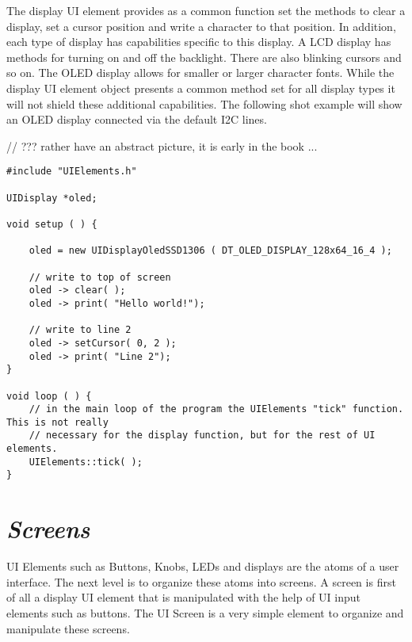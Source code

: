 The display UI element provides as a common function set the methods to clear a display, set a cursor position and write a character to that position. In addition, each type of display has capabilities specific to this display. A LCD display has methods for turning on and off the backlight. There are also blinking cursors and so on. The OLED display allows for smaller or larger character fonts. While the display UI element object presents a common method set for all display types it will not shield these additional capabilities. The following shot example will show an OLED display connected via the default I2C lines.

// ??? rather have an abstract picture, it is early in the book ...


\lstset{language=c++, style=codesnippetstyle}
\begin{lstlisting}
#include "UIElements.h"

UIDisplay *oled;

void setup ( ) {

	oled = new UIDisplayOledSSD1306 ( DT_OLED_DISPLAY_128x64_16_4 );

	// write to top of screen
	oled -> clear( );
	oled -> print( "Hello world!");

	// write to line 2
	oled -> setCursor( 0, 2 );
	oled -> print( "Line 2");
}

void loop ( ) {
	// in the main loop of the program the UIElements "tick" function. This is not really
	// necessary for the display function, but for the rest of UI elements.
	UIElements::tick( );
}
\end{lstlisting}
\FloatBarrier

\section{\textit{Screens}}

UI Elements such as Buttons, Knobs, LEDs and displays are the atoms of a user interface. The next level is to organize these atoms into screens. A screen is first of all a display UI element that is manipulated with the help of UI input elements such as buttons. The UI Screen is a very simple element to organize and manipulate these screens.

